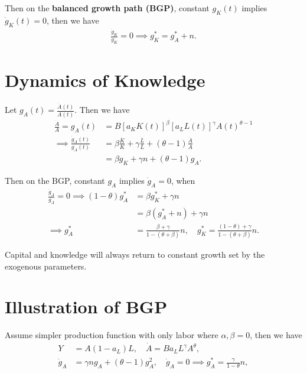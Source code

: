 \documentclass[../main.tex]{subfiles}
\begin{document}
        Then on the \textbf{balanced growth path (BGP)}, constant $g_K(t)$ implies $\dot g_K(t) = 0$, then we have
        \begin{align}
            \frac{\dot g_K}{g_K} = 0
            \implies
            g_K^* = g_A^* + n.
        \end{align}
        
    
    \section{Dynamics of Knowledge}
        Let $g_A(t) = \frac{\dot A(t)}{A(t)}$. Then we have
        \begin{align}
            \frac{\dot A}{A} = g_A(t)
            &= B [a_K K(t)]^\beta [a_L L(t)]^\gamma A(t)^{\theta-1}
            \\
            \implies
            \frac{\dot g_A(t)}{g_A(t)}
            &= \beta \frac{\dot K}{K} + \gamma \frac{\dot L}{L} + (\theta - 1)\frac{\dot A}{A}
            \\
            &= \beta g_K + \gamma n + (\theta - 1) g_A.
        \end{align}
        
        Then on the BGP, constant $g_A$ implies $\dot g_A = 0$, when
        \begin{align}
            \frac{\dot g_A}{g_A} = 0
            \implies
            (1-\theta) g_A^*
            &= \beta g_K^* + \gamma n
            \\
            &= \beta (g_A^* + n) + \gamma n
            \\
            \implies
            g_A^*
            &= \frac{\beta + \gamma}{1- (\theta + \beta)} n,
            \quad
            g_K^* = \frac{(1- \theta) + \gamma}{1-(\theta + \beta)} n.
        \end{align}
        
        Capital and knowledge will always return to constant growth set by the exogenous parameters. 
    \section{Illustration of BGP}
        Assume simpler production function with only labor where $\alpha, \beta = 0$, then we have
        \begin{align}
            Y 
            &= A (1-a_L) L,
            \quad
            \dot A
            = B a_L L^\gamma A^\theta,
            \\
            \dot g_A
            &= \gamma n g_A + (\theta - 1) g_A^2,
            \quad
            \dot g_A = 0 \implies
            g_A^*
            = \frac{\gamma}{1-\theta}n,
        \end{align}
        
\end{document}

